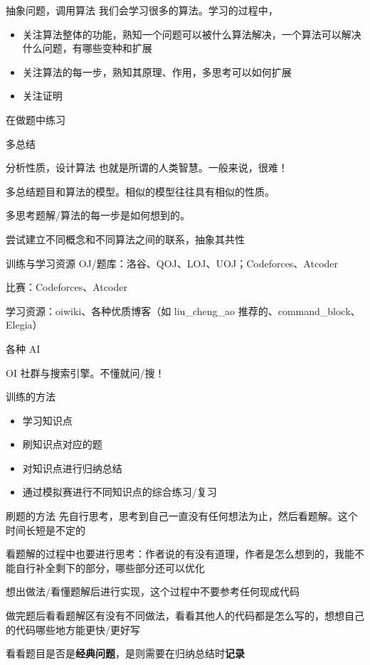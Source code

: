 \documentclass[11pt,aspectratio=169]{beamer}
\begin{document}
\begin{frame}{抽象问题，调用算法}
    我们会学习很多的算法。学习的过程中，
    \begin{itemize}
        \item 关注算法整体的功能，熟知一个问题可以被什么算法解决，一个算法可以解决什么问题，有哪些变种和扩展
        \item 关注算法的每一步，熟知其原理、作用，多思考可以如何扩展
        \item 关注证明
    \end{itemize}

    在做题中练习

    多总结
\end{frame}

\begin{frame}{分析性质，设计算法}
    也就是所谓的人类智慧。一般来说，很难！

    多总结题目和算法的模型。相似的模型往往具有相似的性质。

    多思考题解/算法的每一步是如何想到的。

    尝试建立不同概念和不同算法之间的联系，抽象其共性
\end{frame}

\begin{frame}{训练与学习资源}
    OJ/题库：洛谷、QOJ、LOJ、UOJ；Codeforces、Atcoder

    比赛：Codeforces、Atcoder

    学习资源：oiwiki、各种优质博客（如 liu\_cheng\_ao 推荐的、command\_block、Elegia）

    各种 AI

    OI 社群与搜索引擎。不懂就问/搜！
\end{frame}

\begin{frame}{训练的方法}
    \begin{itemize}
        \item 学习知识点
        \item 刷知识点对应的题
        \item 对知识点进行归纳总结
        \item 通过模拟赛进行不同知识点的综合练习/复习
    \end{itemize}
\end{frame}

\begin{frame}{刷题的方法}
    先自行思考，思考到自己一直没有任何想法为止，然后看题解。这个时间长短是不定的

    看题解的过程中也要进行思考：作者说的有没有道理，作者是怎么想到的，我能不能自行补全剩下的部分，哪些部分还可以优化

    想出做法/看懂题解后进行实现，这个过程中不要参考任何现成代码

    做完题后看看题解区有没有不同做法，看看其他人的代码都是怎么写的，想想自己的代码哪些地方能更快/更好写

    看看题目是否是\textbf{经典问题}，是则需要在归纳总结时\textbf{记录}
\end{frame}
\end{document}
